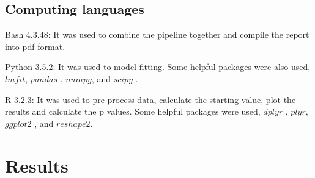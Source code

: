 \documentclass[11pt]{article}
\begin{document}
\subsection{Computing languages}
Bash 4.3.48: It was used to combine the pipeline together and compile the report into pdf format.

Python 3.5.2: It was used to model fitting. Some helpful packages were also used, $lmfit$\citep{newville2016lmfit}, $pandas$ \citep{mckinney2011pandas}, $numpy$\citep{van2011numpy}, and $scipy$ \citep{millman2011python}.

R 3.2.3: It was used to pre-process data, calculate the starting value, plot the results and calculate the p values. Some helpful packages were used, $dplyr$ \citep{wickham2015dplyr}, $plyr$\citep{wickham2009plyr}, $ggplot2$ \citep{wickham2016ggplot2}, and $reshape2$\citep{wickham2012reshape2}.


	\section{Results}
\end{document}
